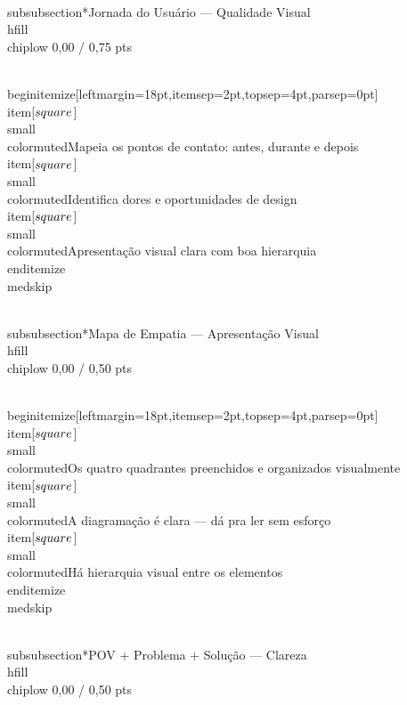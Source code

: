 \documentclass[11pt, a4paper]{article}
\newcommand{\chiplow}[1]{\colorbox{crimsondim}{\color{crimson}\semibold\small\strut\ #1\ }}
\begin{document}
\\subsubsection*{Jornada do Usuário — Qualidade Visual \\hfill {\\chiplow 0,00 / 0,75 pts}}

\\begin{itemize}[leftmargin=18pt,itemsep=2pt,topsep=4pt,parsep=0pt]
  \\item[$\\square$] {\\small\\color{muted}Mapeia os pontos de contato: antes, durante e depois}
  \\item[$\\square$] {\\small\\color{muted}Identifica dores e oportunidades de design}
  \\item[$\\square$] {\\small\\color{muted}Apresentação visual clara com boa hierarquia}
\\end{itemize}
\\medskip

\\subsubsection*{Mapa de Empatia — Apresentação Visual \\hfill {\\chiplow 0,00 / 0,50 pts}}

\\begin{itemize}[leftmargin=18pt,itemsep=2pt,topsep=4pt,parsep=0pt]
  \\item[$\\square$] {\\small\\color{muted}Os quatro quadrantes preenchidos e organizados visualmente}
  \\item[$\\square$] {\\small\\color{muted}A diagramação é clara — dá pra ler sem esforço}
  \\item[$\\square$] {\\small\\color{muted}Há hierarquia visual entre os elementos}
\\end{itemize}
\\medskip

\\subsubsection*{POV + Problema + Solução — Clareza \\hfill {\\chiplow 0,00 / 0,50 pts}}
\end{document}

